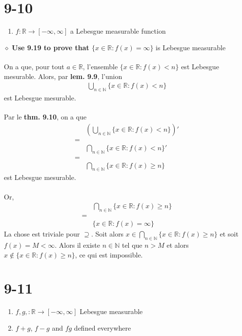 \documentclass[a4paper,10pt]{article}
\begin{document}
\section*{9-10}
\begin{enumerate}
	\item $f: \mathbb{R} \rightarrow [- \infty, \infty]$ a Lebesgue measurable function
\end{enumerate}
$\diamond$ \textbf{Use 9.19 to prove that $\{x \in \mathbb{R} : f(x) = \infty \}$} is Lebesgue measurable
\\
\\
On a que, pour tout $a \in \mathbb{R}$, l'ensemble $\{x \in \mathbb{R} : f(x) < n\}$ est Lebesgue mesurable. Alors, par \textbf{lem. 9.9}, l'union
\begin{align*}
	\bigcup_{n \in \mathbb{N}} \{x \in \mathbb{R} : f(x) < n\}
\end{align*}
est Lebesgue mesurable.
\\
\\
Par le \textbf{thm. 9.10}, on a que 
\begin{align*}
	& \left ( \bigcup_{n \in \mathbb{N}} \{x \in \mathbb{R} : f(x) < n\} \right )' \\
	= \\
	& \bigcap_{n \in \mathbb{N}} \{x \in \mathbb{R} : f(x) < n \} ' \\
	= \\
	& \bigcap_{n \in \mathbb{N}} \{x \in \mathbb{R} : f(x) \geq n \}
\end{align*}
est Lebesgue mesurable.
\\
\\
Or, 
\begin{align*}
	& \bigcap_{n \in \mathbb{N}} \{ x \in \mathbb{R} : f(x) \geq n \} \\
	= \\
	& \{x \in \mathbb{R} : f(x) = \infty \}
\end{align*}
La chose est triviale pour $\supseteq$. Soit alors $x \in \bigcap_{n \in \mathbb{N} } \{ x \in \mathbb{R} : f(x) \geq n \}$ et soit $f(x) = M < \infty$. Alors il existe $n \in \mathbb{N}$ tel que $n > M$ et alors $x \not \in \{x \in \mathbb{R} : f(x) \geq n \}$, ce qui est impossible. 

\section*{9-11}

\begin{enumerate}
	\item $f,g, : \mathbb{R} \rightarrow [- \infty, \infty]$ Lebesgue measurable
	\item $f+g$, $f-g$ and $fg$ defined everywhere 
\end{enumerate}
\end{document}
